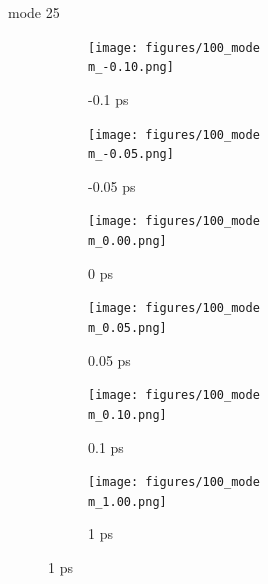 \documentclass{beamer}
\newcommand\w{0.32}
\begin{document}
\renewcommand\m{25}
\begin{frame}{mode \m}
	\begin{figure}
		\centering
		\begin{subfigure}[b]{\w\textwidth}
			\centering
			\texttt{[image: figures/100\_mode\\m\_-0.10.png]}
			\caption{-0.1 ps}
		\end{subfigure}
		\begin{subfigure}[b]{\w\textwidth}
			\centering
			\texttt{[image: figures/100\_mode\\m\_-0.05.png]}
			\caption{-0.05 ps}
		\end{subfigure}
		\begin{subfigure}[b]{\w\textwidth}
			\centering
			\texttt{[image: figures/100\_mode\\m\_0.00.png]}
			\caption{0 ps}
		\end{subfigure}
		\begin{subfigure}[b]{\w\textwidth}
			\centering
			\texttt{[image: figures/100\_mode\\m\_0.05.png]}
			\caption{0.05 ps}
		\end{subfigure}
		\begin{subfigure}[b]{\w\textwidth}
			\centering
			\texttt{[image: figures/100\_mode\\m\_0.10.png]}
			\caption{0.1 ps}
		\end{subfigure}
		\begin{subfigure}[b]{\w\textwidth}
			\centering
			\texttt{[image: figures/100\_mode\\m\_1.00.png]}
			\caption{1 ps}
		\end{subfigure}
	\end{figure}
\end{frame}
\end{document}

